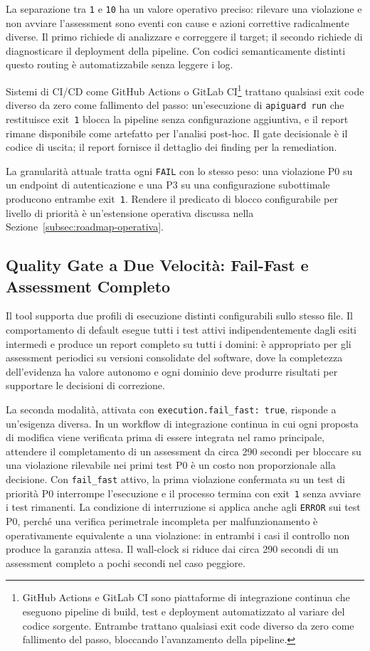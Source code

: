 La separazione tra \texttt{1} e \texttt{10} ha un valore operativo preciso: rilevare una violazione e non avviare l'assessment sono eventi con cause e azioni correttive radicalmente diverse. Il primo richiede di analizzare e correggere il target; il secondo richiede di diagnosticare il deployment della pipeline. Con codici semanticamente distinti questo routing è automatizzabile senza leggere i log.

Sistemi di \gls{CI/CD} come GitHub Actions o GitLab \gls{CI}\footnote{GitHub Actions e GitLab CI sono piattaforme di integrazione continua che eseguono pipeline di build, test e deployment automatizzato al variare del codice sorgente. Entrambe trattano qualsiasi exit code diverso da zero come fallimento del passo, bloccando l'avanzamento della pipeline.} trattano qualsiasi exit code diverso da zero come fallimento del passo: un'esecuzione di \texttt{apiguard run} che restituisce exit~\texttt{1} blocca la pipeline senza configurazione aggiuntiva, e il report rimane disponibile come artefatto per l'analisi post-hoc. Il gate decisionale è il codice di uscita; il report fornisce il dettaglio dei finding per la remediation.

La granularità attuale tratta ogni \texttt{FAIL} con lo stesso peso: una violazione P0 su un endpoint di autenticazione e una P3 su una configurazione subottimale producono entrambe exit~\texttt{1}. Rendere il predicato di blocco configurabile per livello di priorità è un'estensione operativa discussa nella Sezione~\ref{subsec:roadmap-operativa}.

\subsection{Quality Gate a Due Velocità: Fail-Fast e Assessment Completo}\label{subsec:fail-fast}

Il tool supporta due profili di esecuzione distinti configurabili sullo stesso file. Il comportamento di default esegue tutti i test attivi indipendentemente dagli esiti intermedi e produce un report completo su tutti i domini: è appropriato per gli assessment periodici su versioni consolidate del software, dove la completezza dell'evidenza ha valore autonomo e ogni dominio deve produrre risultati per supportare le decisioni di correzione.

La seconda modalità, attivata con \texttt{execution.fail\_fast:~true}, risponde a un'esigenza diversa. In un workflow di integrazione continua in cui ogni proposta di modifica viene verificata prima di essere integrata nel ramo principale, attendere il completamento di un assessment da circa 290 secondi per bloccare su una violazione rilevabile nei primi test P0 è un costo non proporzionale alla decisione. Con \texttt{fail\_fast} attivo, la prima violazione confermata su un test di priorità P0 interrompe l'esecuzione e il processo termina con exit~\texttt{1} senza avviare i test rimanenti. La condizione di interruzione si applica anche agli \texttt{ERROR} sui test P0, perché una verifica perimetrale incompleta per malfunzionamento è operativamente equivalente a una violazione: in entrambi i casi il controllo non produce la garanzia attesa. Il wall-clock si riduce dai circa 290 secondi di un assessment completo a pochi secondi nel caso peggiore.



